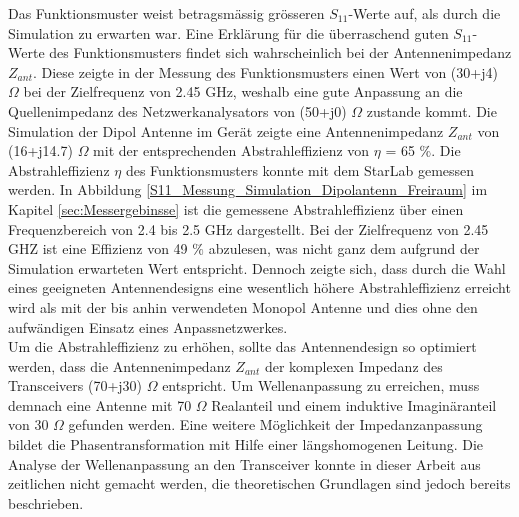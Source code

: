 Das Funktionsmuster weist betragsmässig grösseren $S_{11}$-Werte auf, als durch die Simulation zu erwarten war. Eine Erklärung für die überraschend guten $S_{11}$-Werte des Funktionsmusters findet sich wahrscheinlich bei der Antennenimpedanz $Z_{ant}$. Diese zeigte in der Messung des Funktionsmusters einen Wert von (30+j4) $\Omega$ bei der Zielfrequenz von 2.45 GHz, weshalb eine gute Anpassung an die Quellenimpedanz des Netzwerkanalysators von (50+j0) $\Omega$ zustande kommt. Die Simulation der Dipol Antenne im Gerät zeigte eine Antennenimpedanz $Z_{ant}$ von (16+j14.7) $\Omega$  mit der entsprechenden Abstrahleffizienz von $\eta$ = 65 $\%$. Die Abstrahleffizienz $\eta$ des Funktionsmusters konnte mit dem StarLab gemessen werden. In Abbildung \ref{S11_Messung_Simulation_Dipolantenn_Freiraum} im Kapitel \ref{sec:Messergebinsse} ist die gemessene Abstrahleffizienz über einen Frequenzbereich von 2.4 bis 2.5 GHz dargestellt. Bei der Zielfrequenz von 2.45 GHZ ist eine Effizienz von 49 $\%$ abzulesen, was nicht ganz dem aufgrund der Simulation erwarteten Wert entspricht. Dennoch zeigte sich, dass durch die Wahl eines geeigneten Antennendesigns  eine wesentlich höhere Abstrahleffizienz erreicht wird als mit der bis anhin verwendeten Monopol Antenne und dies ohne den aufwändigen Einsatz eines Anpassnetzwerkes.\\
Um die Abstrahleffizienz  zu erhöhen, sollte das Antennendesign so optimiert werden, dass die Antennenimpedanz $Z_{ant}$ der komplexen Impedanz des Transceivers (70+j30) $\Omega$ entspricht. Um Wellenanpassung zu erreichen, muss demnach eine Antenne mit 70 $\Omega$ Realanteil und einem induktive Imaginäranteil von 30 $\Omega$ gefunden werden. Eine weitere Möglichkeit der Impedanzanpassung bildet die Phasentransformation mit Hilfe einer längshomogenen Leitung. Die Analyse der Wellenanpassung an den Transceiver konnte in dieser Arbeit aus zeitlichen nicht gemacht werden, die theoretischen Grundlagen sind jedoch bereits beschrieben. \\
